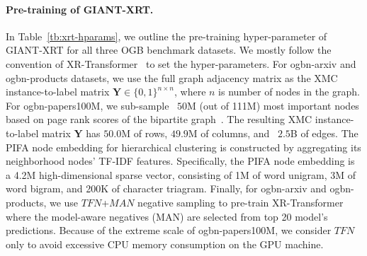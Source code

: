 \documentclass{article} %
\begin{document}
\paragraph{Pre-training of GIANT-XRT.}
In Table~\ref{tb:xrt-hparams}, we outline the pre-training hyper-parameter of GIANT-XRT for all three OGB benchmark datasets.
We mostly follow the convention of XR-Transformer~\citep{jiong2021fast} to set the hyper-parameters.
For ogbn-arxiv and ogbn-products datasets, we use the full graph adjacency matrix as the XMC instance-to-label matrix $\mathbf{Y} \in \{0,1\}^{n \times n}$, where $n$ is number of nodes in the graph.
For ogbn-papers100M, we sub-sample ~$50$M (out of 111M) most important nodes based on page rank scores of the bipartite graph~\citep{he2016birank}.
The resulting XMC instance-to-label matrix $\mathbf{Y}$ has $50.0$M of rows, $49.9$M of columns, and ~$2.5$B of edges.
The PIFA node embedding for hierarchical clustering is constructed by aggregating its neighborhood nodes' TF-IDF features.
Specifically, the PIFA node embedding is a 4.2M high-dimensional sparse vector, consisting of 1M of word unigram, 3M of word bigram, and 200K of character triagram. 
Finally, for ogbn-arxiv and ogbn-products, we use $TFN$+$MAN$ negative sampling to pre-train XR-Transformer where the model-aware negatives (MAN) are selected from top 20 model's predictions.
Because of the extreme scale of ogbn-papers100M, we consider $TFN$ only to avoid excessive CPU memory consumption on the GPU machine.
\end{document}

